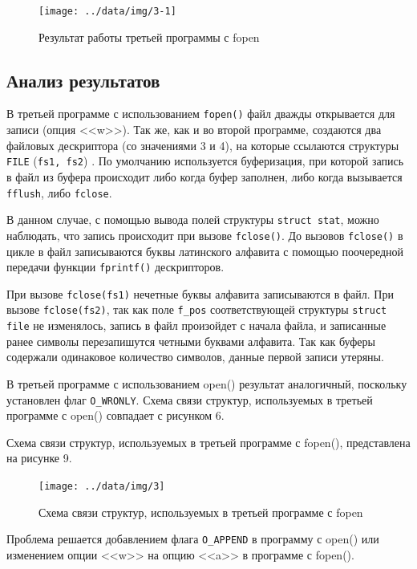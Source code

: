 \begin{figure}[ht]
	\centering
	\texttt{[image: ../data/img/3-1]}
	\caption{Результат работы третьей программы с fopen}
\end{figure}\newpage

\captionsetup{singlelinecheck = false, justification=raggedright}


\captionsetup{singlelinecheck = false, justification=raggedright}


\subsection{Анализ результатов}

В третьей программе с использованием \texttt{fopen()} файл дважды открывается для записи (опция <<w>>). Так же, как и во второй программе,
создаются два файловых дескриптора (со значениями 3 и 4), на которые
ссылаются структуры \texttt{FILE} (\texttt{fs1, fs2}) . По умолчанию используется
буферизация, при которой запись в файл из буфера происходит либо когда буфер
заполнен, либо когда вызывается \texttt{fflush}, либо
\texttt{fclose}.

В данном случае, с помощью вывода полей структуры \texttt{struct stat}, можно наблюдать, что запись происходит при вызове \texttt{fclose()}. До
вызовов \texttt{fclose()} в цикле в файл записываются буквы латинского
алфавита с помощью поочередной передачи функции \texttt{fprintf()} дескрипторов.

При вызове \texttt{fclose(fs1)} нечетные буквы алфавита записываются в файл.
При вызове \texttt{fclose(fs2)}, так как поле \texttt{f\_pos}
соответствующей структуры \texttt{struct file} не изменялось, запись в файл
произойдет с начала файла, и записанные ранее символы перезапишутся четными буквами алфавита.
Так как буферы содержали одинаковое количество символов, данные первой
записи утеряны.

В третьей программе с использованием open() результат аналогичный, поскольку установлен флаг \texttt{O\_WRONLY}. Схема связи структур, используемых в третьей программе с open() совпадает с рисунком 6.

Схема связи структур, используемых в третьей программе с fopen(), представлена на рисунке 9.

\begin{figure}[ht]
	\centering
	\texttt{[image: ../data/img/3]}
	\caption{Схема связи структур, используемых в третьей программе с fopen}
\end{figure}

Проблема решается добавлением флага \texttt{O\_APPEND} в программу с open() или изменением опции <<w>> на опцию <<a>> в программе с fopen().

